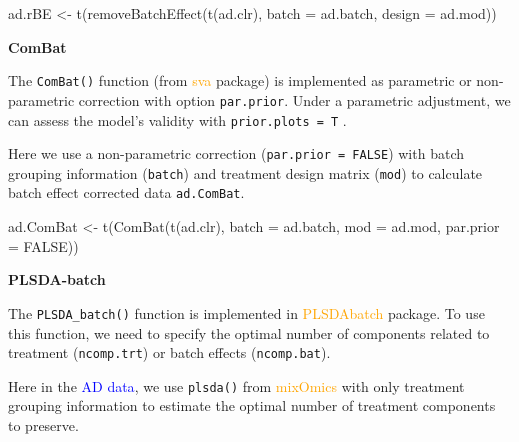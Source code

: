 \documentclass[
]{book}
\newenvironment{Shaded}{\begin{snugshade}}{\end{snugshade}}
\newcommand{\AttributeTok}[1]{\textcolor[rgb]{0.77,0.63,0.00}{#1}}
\newcommand{\CommentTok}[1]{\textcolor[rgb]{0.56,0.35,0.01}{\textit{#1}}}
\newcommand{\ConstantTok}[1]{\textcolor[rgb]{0.00,0.00,0.00}{#1}}
\newcommand{\DecValTok}[1]{\textcolor[rgb]{0.00,0.00,0.81}{#1}}
\newcommand{\FunctionTok}[1]{\textcolor[rgb]{0.00,0.00,0.00}{#1}}
\newcommand{\NormalTok}[1]{#1}
\newcommand{\OtherTok}[1]{\textcolor[rgb]{0.56,0.35,0.01}{#1}}
\newcommand{\SpecialCharTok}[1]{\textcolor[rgb]{0.00,0.00,0.00}{#1}}
\begin{document}
\begin{Shaded}
\begin{Highlighting}[]
\NormalTok{ad.rBE }\OtherTok{\textless{}{-}} \FunctionTok{t}\NormalTok{(}\FunctionTok{removeBatchEffect}\NormalTok{(}\FunctionTok{t}\NormalTok{(ad.clr), }\AttributeTok{batch =}\NormalTok{ ad.batch, }
                              \AttributeTok{design =}\NormalTok{ ad.mod))}
\end{Highlighting}
\end{Shaded}

\textbf{ComBat}

The \texttt{ComBat()} function (from \textcolor{orange}{sva} package) is implemented as parametric or non-parametric correction with option \texttt{par.prior}. Under a parametric adjustment, we can assess the model's validity with \texttt{prior.plots\ =\ T} \citep{leek2012sva}.

Here we use a non-parametric correction (\texttt{par.prior\ =\ FALSE}) with batch grouping information (\texttt{batch}) and treatment design matrix (\texttt{mod}) to calculate batch effect corrected data \texttt{ad.ComBat}.

\begin{Shaded}
\begin{Highlighting}[]
\NormalTok{ad.ComBat }\OtherTok{\textless{}{-}} \FunctionTok{t}\NormalTok{(}\FunctionTok{ComBat}\NormalTok{(}\FunctionTok{t}\NormalTok{(ad.clr), }\AttributeTok{batch =}\NormalTok{ ad.batch, }
                      \AttributeTok{mod =}\NormalTok{ ad.mod, }\AttributeTok{par.prior =} \ConstantTok{FALSE}\NormalTok{))}
\end{Highlighting}
\end{Shaded}

\textbf{PLSDA-batch}

The \texttt{PLSDA\_batch()} function is implemented in \textcolor{orange}{PLSDAbatch} package. To use this function, we need to specify the optimal number of components related to treatment (\texttt{ncomp.trt}) or batch effects (\texttt{ncomp.bat}).

Here in the \textcolor{blue}{AD data}, we use \texttt{plsda()} from \textcolor{orange}{mixOmics} with only treatment grouping information to estimate the optimal number of treatment components to preserve.

\begin{Shaded}
\end{Shaded}
\end{document}
